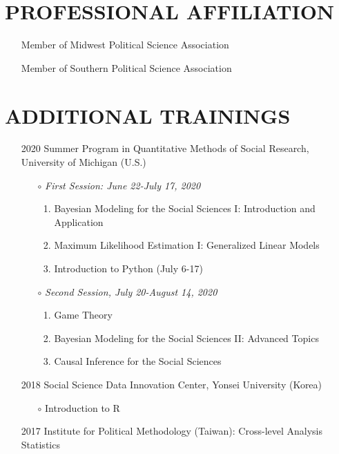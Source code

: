 \documentclass[11pt]{res} %
\begin{document}
\begin{resume}
\section{PROFESSIONAL AFFILIATION} 
 \begin{itemize}[wide = 0pt] \itemsep -2pt 
 	\item[ ] Member of Midwest Political Science Association
 	\item[ ] Member of Southern Political Science Association
\end{itemize}

\section{ADDITIONAL TRAININGS} 
\begin{itemize}[wide = 0pt] \itemsep -2pt 
	\item[2020] Summer Program in Quantitative Methods of Social Research, University of Michigan (U.S.)
	\begin{itemize}
		\item[$\circ$] \textit{First Session: June 22-July 17, 2020}
		\begin{enumerate}
			\item Bayesian Modeling for the Social Sciences I: Introduction and Application
			\item Maximum Likelihood Estimation I: Generalized Linear Models
			\item Introduction to Python (July 6-17)
		\end{enumerate}
		\item[$\circ$] \textit{Second Session, July 20-August 14, 2020}
		\begin{enumerate}
			\item Game Theory
			\item Bayesian Modeling for the Social Sciences II: Advanced Topics
			\item Causal Inference for the Social Sciences
		\end{enumerate}
	\end{itemize}
	\item[2018] Social Science Data Innovation Center, Yonsei University (Korea)
	\begin{itemize}
	\item[$\circ$] Introduction to R
	\end{itemize}
	\item[2017] Institute for Political Methodology (Taiwan): Cross-level Analysis
	Statistics
	\begin{itemize} \itemsep -2pt 

\end{itemize}
\end{itemize}
\end{resume}
\end{document}
